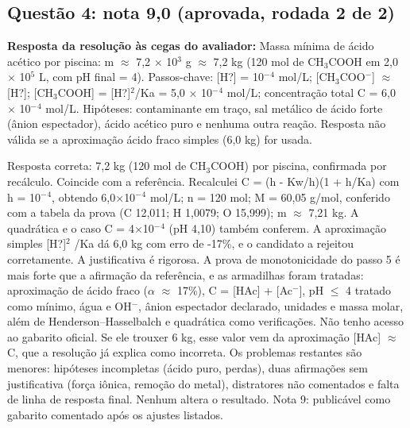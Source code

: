\documentclass{article}%
\begin{document}
\subsection*{Questão 4: nota 9,0 (aprovada, rodada 2 de 2)}%
\textbf{Resposta da resolução às cegas do avaliador:} Massa mínima de ácido acético por piscina: m $\approx$ 7,2 $\times$ 10$^3$ g $\approx$ 7,2 kg (120 mol de CH$_{3}$COOH em 2,0 $\times$ 10$^{5}$ L, com pH final = 4).\newline%
\newline%
Passos{-}chave: {[}H?{]} = 10$^{-}$$^{4}$ mol/L; {[}CH$_{3}$COO$^{-}${]} $\approx$ {[}H?{]}; {[}CH$_{3}$COOH{]} = {[}H?{]}$^2$/Ka = 5,0 $\times$ 10$^{-}$$^{4}$ mol/L; concentração total C = 6,0 $\times$ 10$^{-}$$^{4}$ mol/L.\newline%
\newline%
Hipóteses: contaminante em traço, sal metálico de ácido forte (ânion espectador), ácido acético puro e nenhuma outra reação. Resposta não válida se a aproximação ácido fraco simples (6,0 kg) for usada.\par %
Resposta correta: 7,2 kg (120 mol de CH$_{3}$COOH) por piscina, confirmada por recálculo. Coincide com a referência. Recalculei C = (h - Kw/h)(1 + h/Ka) com h = 10$^{-}$$^{4}$, obtendo 6,0$\times$10$^{-}$$^{4}$ mol/L; n = 120 mol; M = 60,05 g/mol, conferido com a tabela da prova (C 12,011; H 1,0079; O 15,999); m $\approx$ 7,21 kg. A quadrática e o caso C = 4$\times$10$^{-}$$^{4}$ (pH 4,10) também conferem. A aproximação simples {[}H?{]}$^2$ /Ka dá 6,0 kg com erro de -17\%, e o candidato a rejeitou corretamente. A justificativa é rigorosa. A prova de monotonicidade do passo 5 é mais forte que a afirmação da referência, e as armadilhas foram tratadas: aproximação de ácido fraco ($\alpha$ $\approx$ 17\%), C = {[}HAc{]} + {[}Ac$^{-}${]}, pH $\leq$ 4 tratado como mínimo, água e OH$^{-}$, ânion espectador declarado, unidades e massa molar, além de Henderson--Hasselbalch e quadrática como verificações. Não tenho acesso ao gabarito oficial. Se ele trouxer 6 kg, esse valor vem da aproximação {[}HAc{]} $\approx$ C, que a resolução já explica como incorreta. Os problemas restantes são menores: hipóteses incompletas (ácido puro, perdas), duas afirmações sem justificativa (força iônica, remoção do metal), distratores não comentados e falta de linha de resposta final. Nenhum altera o resultado. Nota 9: publicável como gabarito comentado após os ajustes listados.%
\end{document}
